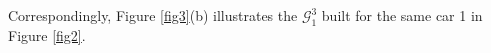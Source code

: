 \documentclass[12pt]{article}
\begin{document}
Correspondingly, Figure \ref{fig3}(b) illustrates the $\mathcal{G}^3_1$ built for the same car 1 in Figure \ref{fig2}.



\end{document}
